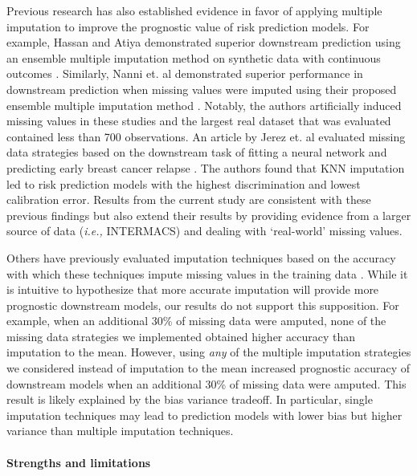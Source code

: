 \documentclass{article}
\begin{document}
Previous research has also established evidence in favor of applying
multiple imputation to improve the prognostic value of risk prediction
models. For example, Hassan and Atiya demonstrated superior downstream
prediction using an ensemble multiple imputation method on synthetic
data with continuous outcomes \cite{hassan2007regression}. Similarly,
Nanni et. al demonstrated superior performance in downstream prediction
when missing values were imputed using their proposed ensemble multiple
imputation method \cite{nanni2012classifier}. Notably, the authors
artificially induced missing values in these studies and the largest
real dataset that was evaluated contained less than 700 observations. An
article by Jerez et. al evaluated missing data strategies based on the
downstream task of fitting a neural network and predicting early breast
cancer relapse \cite{jerez2010missing}. The authors found that KNN
imputation led to risk prediction models with the highest discrimination
and lowest calibration error. Results from the current study are
consistent with these previous findings but also extend their results by
providing evidence from a larger source of data
(\textit{i.e., } INTERMACS) and dealing with `real-world' missing
values.

Others have previously evaluated imputation techniques based on the
accuracy with which these techniques impute missing values in the
training data
\cite{tutz2015improved, little2013joys, steele2018machine}. While it is
intuitive to hypothesize that more accurate imputation will provide more
prognostic downstream models, our results do not support this
supposition. For example, when an additional 30\% of missing data were
amputed, none of the missing data strategies we implemented obtained
higher accuracy than imputation to the mean. However, using \emph{any}
of the multiple imputation strategies we considered instead of
imputation to the mean increased prognostic accuracy of downstream
models when an additional 30\% of missing data were amputed. This result
is likely explained by the bias variance tradeoff. In particular, single
imputation techniques may lead to prediction models with lower bias but
higher variance than multiple imputation techniques.

\paragraph{Strengths and limitations}
\end{document}
